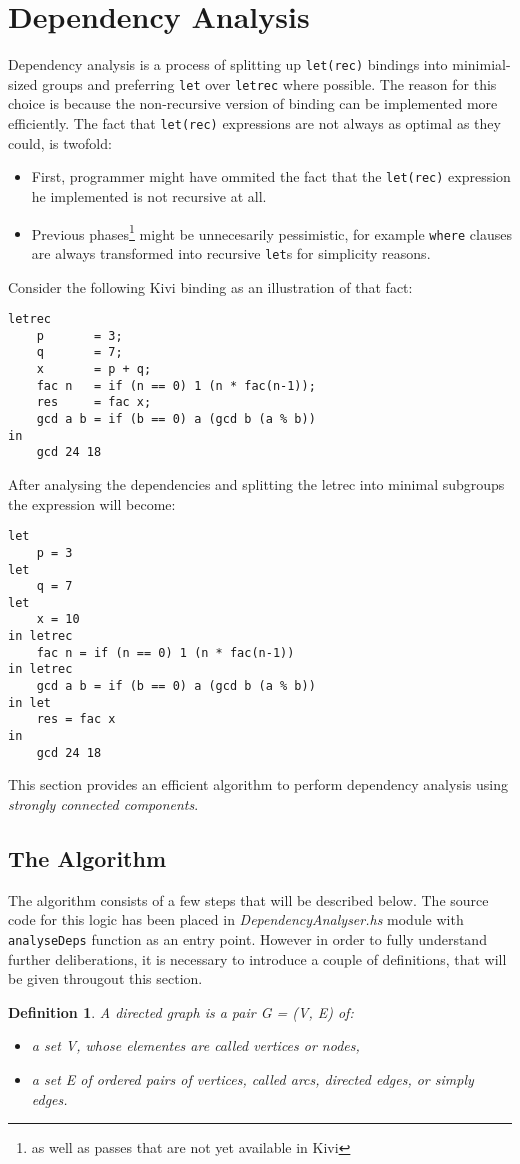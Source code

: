 \documentclass[a4paper]{report}
\newtheorem{definition}{Definition}[chapter]
\begin{document}
\section{Dependency Analysis}
Dependency analysis is a process of splitting up \texttt{let(rec)} bindings
into minimial-sized groups and preferring \texttt{let} over \texttt{letrec}
where possible. The reason for this choice is because the non-recursive version
of binding can be implemented more efficiently. The fact that \texttt{let(rec)}
expressions are not always as optimal as they could, is twofold:
\begin{itemize}
  \item First, programmer might have ommited the fact that the
    \texttt{let(rec)} expression he implemented is not recursive at all.
  \item Previous phases\footnote{as well as passes that are not yet available
    in Kivi} might be unnecesarily pessimistic, for example \texttt{where}
    clauses are always transformed into recursive \texttt{let}s for simplicity
    reasons.
\end{itemize}
Consider the following Kivi binding as an illustration of that fact:
\begin{lstlisting}[label=lst:letrec_dependency_example,caption={Example of
  \texttt{letrec} before dependency analysis.}]
letrec
    p       = 3;
    q       = 7;
    x       = p + q;
    fac n   = if (n == 0) 1 (n * fac(n-1));
    res     = fac x;
    gcd a b = if (b == 0) a (gcd b (a % b))
in
    gcd 24 18
\end{lstlisting}
After analysing the dependencies and splitting the letrec into minimal
subgroups the expression will become:
\begin{lstlisting}[label=lst:letrec_after_anlysis,caption={\texttt{letrec}
  after performing dependency anlysis.}]
let
    p = 3
let
    q = 7
let
    x = 10
in letrec
    fac n = if (n == 0) 1 (n * fac(n-1))
in letrec
    gcd a b = if (b == 0) a (gcd b (a % b))
in let
    res = fac x
in
    gcd 24 18
\end{lstlisting}
This section provides an efficient algorithm to perform dependency analysis
using \textit{strongly connected components}.

\subsection{The Algorithm}
The algorithm consists of a few steps that will be described below. The source
code for this logic has been placed in \textit{DependencyAnalyser.hs} module
with \texttt{analyseDeps} function as an entry point. However in order to fully
understand further deliberations, it is necessary to introduce a couple of
definitions, that will be given througout this section.
\begin{definition}
A directed graph is a pair G = (V, E) of:
\begin{itemize}
  \item a set V, whose elementes are called vertices or nodes,
  \item a set E of ordered pairs of vertices, called arcs, directed edges, or
    simply edges.
\end{itemize}
\end{definition}
\end{document}
